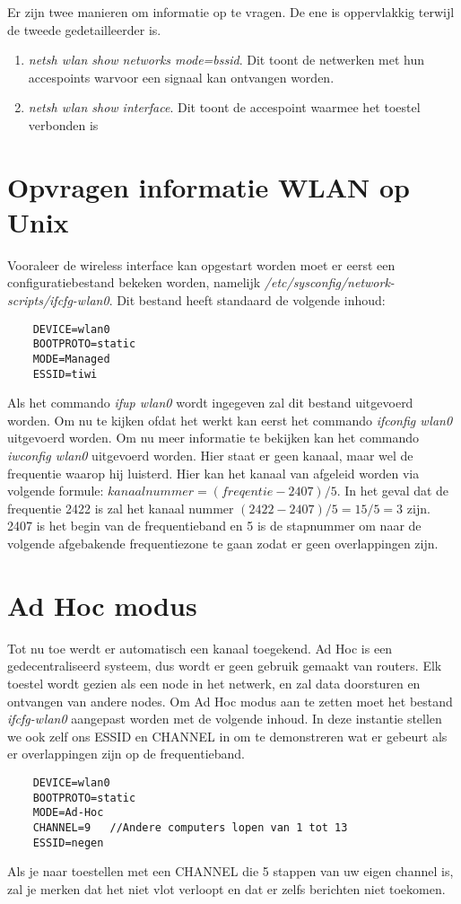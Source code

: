 \documentclass{report}
\begin{document}
Er zijn twee manieren om informatie op te vragen. De ene is oppervlakkig terwijl de tweede gedetailleerder is.

\begin{enumerate}
	\item \textit{netsh wlan show networks mode=bssid}. Dit toont de netwerken met hun accespoints warvoor een signaal kan ontvangen worden.
	\item \textit{netsh wlan show interface}. Dit toont de accespoint waarmee het toestel verbonden is
\end{enumerate}

\section{Opvragen informatie WLAN op Unix}
Vooraleer de wireless interface kan opgestart worden moet er eerst een configuratiebestand bekeken worden, namelijk \textit{/etc/sysconfig/network-scripts/ifcfg-wlan0}. Dit bestand heeft standaard de volgende inhoud:
\begin{lstlisting}
	DEVICE=wlan0
	BOOTPROTO=static
	MODE=Managed
	ESSID=tiwi
\end{lstlisting}
Als het commando \textit{ifup wlan0} wordt ingegeven zal dit bestand uitgevoerd worden. Om nu te kijken ofdat het werkt kan eerst het commando \textit{ifconfig wlan0} uitgevoerd worden. Om nu meer informatie te bekijken kan het commando \textit{iwconfig wlan0} uitgevoerd worden. Hier staat er geen kanaal, maar wel de frequentie waarop hij luisterd. Hier kan het kanaal van afgeleid worden via volgende formule: $ kanaalnummer = (freqentie - 2407) / 5 $. In het geval dat de frequentie 2422 is zal het kanaal nummer $ (2422 - 2407) / 5 = 15 / 5 = 3 $ zijn. 2407 is het begin van de frequentieband en 5 is de stapnummer om naar de volgende afgebakende frequentiezone te gaan zodat er geen overlappingen zijn.

\section{Ad Hoc modus}
Tot nu toe werdt er automatisch een kanaal toegekend. Ad Hoc is een gedecentraliseerd systeem, dus wordt er geen gebruik gemaakt van routers. Elk toestel wordt gezien als een node in het netwerk, en zal data doorsturen en ontvangen van andere nodes. Om Ad Hoc modus aan te zetten moet het bestand \textit{ifcfg-wlan0} aangepast worden met de volgende inhoud. In deze instantie stellen we ook zelf ons ESSID en CHANNEL in om te demonstreren wat er gebeurt als er overlappingen zijn op de frequentieband.
\begin{lstlisting}
	DEVICE=wlan0
	BOOTPROTO=static
	MODE=Ad-Hoc
	CHANNEL=9 	//Andere computers lopen van 1 tot 13
	ESSID=negen
\end{lstlisting}
Als je naar toestellen met een CHANNEL die 5 stappen van uw eigen channel is, zal je merken dat het niet vlot verloopt en dat er zelfs berichten niet toekomen.
\end{document}
